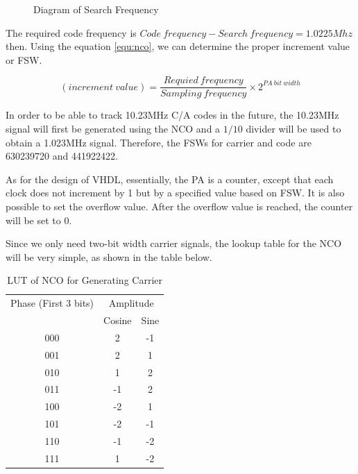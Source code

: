 \begin{figure}[!htbp]
    \centering
    
    \caption{Diagram of Search Frequency}
    \label{fig:search_frequency}
\end{figure}

The required code frequency is $Code\  frequency-Search\ frequency = 1.0225Mhz$ then. Using the equation \ref{equ:nco}, we can determine the proper increment value or FSW.

\begin{equation}
    (increment\ value) = \frac{Requied\ frequency}{Sampling\ frequency} \times 2^{PA\ bit\ width}
\end{equation}

In order to be able to track 10.23MHz C/A codes in the future, the 10.23MHz signal will first be generated using the NCO and a $1/10$ divider will be used to obtain a 1.023MHz signal. Therefore, the FSWs for carrier and code are \num{630239720} and \num{441922422}.

As for the design of VHDL, essentially, the PA is a counter, except that each clock does not increment by 1 but by a specified value based on FSW. It is also possible to set the overflow value. After the overflow value is reached, the counter will be set to 0.

Since we only need two-bit width carrier signals, the lookup table for the NCO will be very simple, as shown in the table below.

\begin{table}[!htbp]
\centering
\renewcommand\arraystretch{1.5}
\caption{LUT of NCO for Generating Carrier}
\label{tab:lut_nco}
\begin{tabular}{ccc}
    \toprule
    Phase (First 3 bits) & \multicolumn{2}{c}{Amplitude} \\
    & Cosine & Sine \\
    \midrule
    000 & 2 & -1 \\
    001 & 2 & 1 \\
    010 & 1 & 2 \\
    011 & -1 & 2 \\
    100 & -2 & 1 \\
    101 & -2 & -1 \\
    110 & -1 & -2 \\
    111 & 1 & -2 \\
    \bottomrule
\end{tabular}
\end{table}

